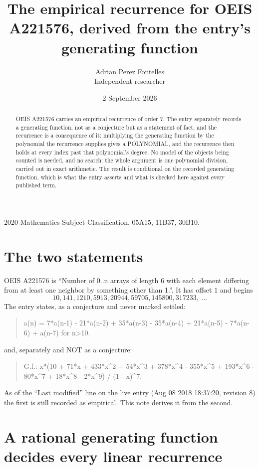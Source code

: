 \documentclass[11pt,a4paper]{article}
\title{The empirical recurrence for OEIS A221576, derived from the entry's generating function}
\author{Adrian Perez Fontelles\\ \small Independent researcher}
\date{2 September 2026}
\theoremstyle{plain}
\theoremstyle{definition}
\begin{document}
\maketitle

\begin{abstract}
OEIS A221576 carries an empirical recurrence of order $7$. The entry separately records a
generating function, not as a conjecture but as a statement of fact, and the recurrence is a
consequence of it: multiplying the generating function by the polynomial the recurrence
supplies gives a POLYNOMIAL, and the recurrence then holds at every index past that
polynomial's degree. No model of the objects being counted is needed, and no search: the
whole argument is one polynomial division, carried out in exact arithmetic. The result is
conditional on the recorded generating function, which is what the entry asserts and what is
checked here against every published term.
\end{abstract}

\noindent\small 2020 Mathematics Subject Classification. 05A15, 11B37, 30B10.\normalsize

\section{The two statements}

OEIS A221576 is ``Number of 0..n arrays of length 6 with each element differing from at least one neighbor by something other than 1.''. It has offset $1$ and begins
\[
10, 141, 1210, 5913, 20944, 59705, 145800, 317233,\ \dots
\]
The entry states, as a conjecture and never marked settled:
\begin{quote}
a(n) = 7*a(n-1) - 21*a(n-2) + 35*a(n-3) - 35*a(n-4) + 21*a(n-5) - 7*a(n-6) + a(n-7) for n>10.
\end{quote}
and, separately and NOT as a conjecture:
\begin{quote}
G.f.: x*(10 + 71*x + 433*x\^{}2 + 54*x\^{}3 + 378*x\^{}4 - 355*x\^{}5 + 193*x\^{}6 - 80*x\^{}7 + 18*x\^{}8 - 2*x\^{}9) / (1 - x)\^{}7.
\end{quote}
As of the ``Last modified'' line on the live entry (Aug 08 2018 18:37:20, revision 8) the first is still
recorded as empirical. This note derives it from the second.

\section{A rational generating function decides every linear recurrence}
\end{document}
